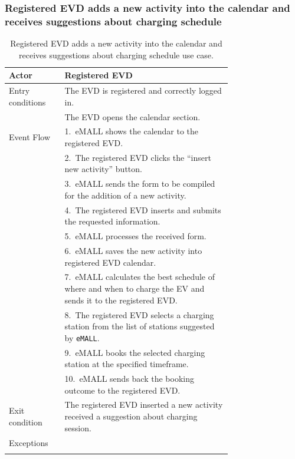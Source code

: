 \subsubsection*{Registered EVD adds a new activity into the calendar and receives suggestions about charging schedule}
\begin{center}
    \begin{longtable}{lp{0.75\linewidth}}
        \hline
        Actor            & Registered EVD                                                                                                \\
        \hline
        Entry conditions & The EVD is registered and correctly logged in.                                                                \\
        & The EVD opens the calendar section.                                                                           \\
        \hline
        Event Flow       & 1.\ eMALL shows the calendar to the registered EVD.                                                           \\
        & 2.\ The registered EVD clicks the ``insert new activity'' button.                                             \\
        & 3.\ eMALL sends the form to be compiled for the addition of a new activity.                                   \\
        & 4.\ The registered EVD inserts and submits the requested information.                                         \\
        & 5.\ eMALL processes the received form.                                                                        \\
        & 6.\ eMALL saves the new activity into registered EVD calendar.                                                \\
        & 7.\ eMALL calculates the best schedule of where and when to charge the EV and sends it to the registered EVD. \\
        & 8.\ The registered EVD selects a charging station from the list of stations suggested by \verb|eMALL|.        \\
        & 9.\ eMALL books the selected charging station at the specified timeframe.                                     \\
        & 10.\ eMALL sends back the booking outcome to the registered EVD.                                              \\
        \hline
        Exit condition   & The registered EVD inserted a new activity received a suggestion about charging session.                      \\
        \hline
        Exceptions       &                                                                                                               \\
        \hline
        \caption{Registered EVD adds a new activity into the calendar and receives suggestions about charging schedule use case.}
        \label{tab: EVD_adds_activity_calendar_use_case}
    \end{longtable}
\end{center}

